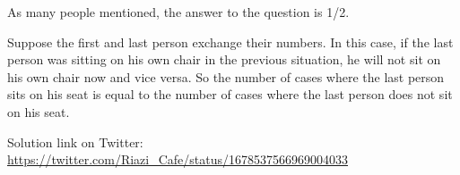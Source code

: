 \begin{solution}
As many people mentioned, the answer to the question is 1/2.

Suppose the first and last person exchange their numbers. In this case, if the last person was sitting on his own chair in the previous situation, he will not sit on his own chair now and vice versa. So the number of cases where the last person sits on his seat is equal to the number of cases where the last person does not sit on his seat.

Solution link on Twitter:  \href{https://twitter.com/Riazi_Cafe/status/1678537566969004033}{https://twitter.com/Riazi_Cafe/status/1678537566969004033}\end{solution}